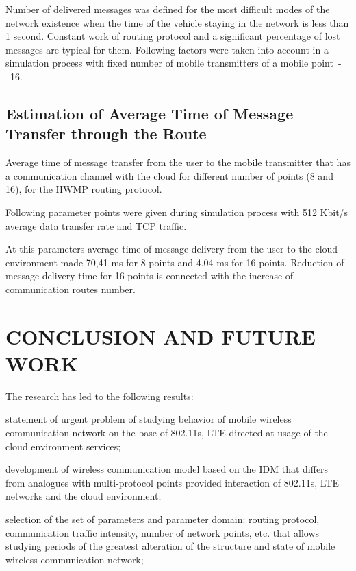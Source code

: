 \documentclass[a4paper,twoside]{article}
\begin{document}
Number of delivered messages was defined for the most difficult modes of the network existence when the time of the vehicle staying in the network is less than 1 second. Constant work of routing protocol and a significant percentage of lost messages are typical for them. Following factors were taken into account in a simulation process with fixed number of mobile transmitters of a mobile point~-~16.

\begin{figure}[!ht]
  \vspace{-0.2cm}
  \vspace{-0.1cm}
\end{figure}

\subsection{Estimation of Average Time of Message Transfer through the Route}

Average time of message transfer from the user to the mobile transmitter that has a communication channel with the cloud for different number of points (8 and 16), for the HWMP routing protocol.

Following parameter points were given during simulation process with 512 Kbit/s average data transfer rate and TCP traffic.

At this parameters average time of message delivery from the user to the cloud environment made 70,41 ms for 8 points and 4.04 ms for 16 points. Reduction of message delivery time for 16 points is connected with the increase of communication routes number.

\section{CONCLUSION AND FUTURE WORK}

The research has led to the following results:

statement of urgent problem of studying behavior of mobile wireless communication network on the base of 802.11s, LTE directed at usage of the cloud environment services;

development of wireless communication model based on the IDM that differs from analogues with multi-protocol points provided interaction of 802.11s, LTE networks and the cloud environment;

selection of the set of parameters and parameter domain: routing protocol, communication traffic intensity, number of network points, etc. that allows studying periods of the greatest alteration of the structure and state of mobile wireless communication network;
\end{document}
